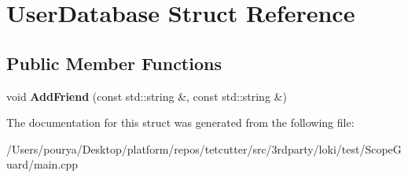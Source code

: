 \hypertarget{structUserDatabase}{}\section{User\+Database Struct Reference}
\label{structUserDatabase}
\subsection*{Public Member Functions}
\begin{DoxyCompactItemize}
\item 
\hypertarget{structUserDatabase_a53ccf7945a02e137931d8a4382571db3}{}void {\bfseries Add\+Friend} (const std\+::string \&, const std\+::string \&)\label{structUserDatabase_a53ccf7945a02e137931d8a4382571db3}

\end{DoxyCompactItemize}


The documentation for this struct was generated from the following file\+:\begin{DoxyCompactItemize}
\item 
/\+Users/pourya/\+Desktop/platform/repos/tetcutter/src/3rdparty/loki/test/\+Scope\+Guard/main.\+cpp\end{DoxyCompactItemize}
